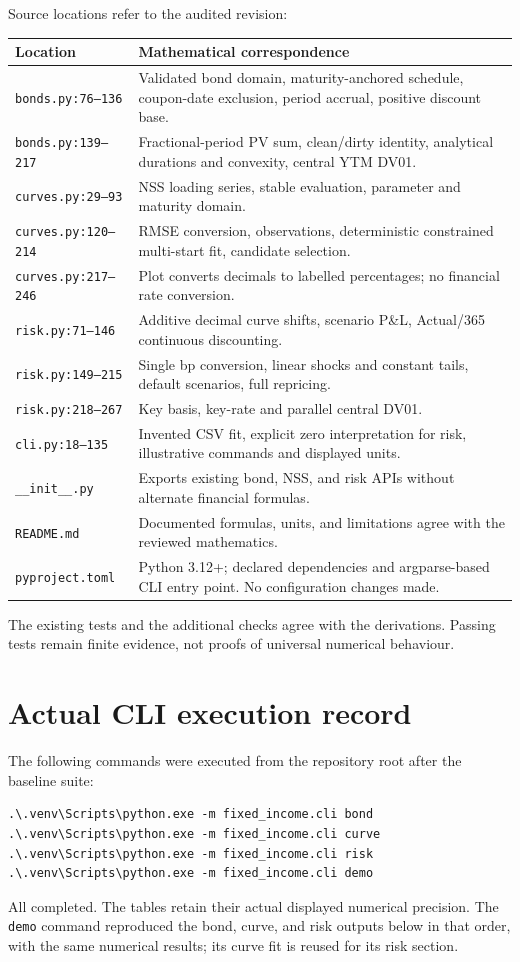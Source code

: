\documentclass[12pt,a4paper]{article}
\begin{document}
Source locations refer to the audited revision:
\small
\begin{longtable}{@{}p{}p{}@{}}
\toprule
Location & Mathematical correspondence\\
\midrule
\endhead
\texttt{bonds.py:76--136} & Validated bond domain, maturity-anchored schedule, coupon-date exclusion, period accrual, positive discount base.\\
\texttt{bonds.py:139--217} & Fractional-period PV sum, clean/dirty identity, analytical durations and convexity, central YTM DV01.\\
\texttt{curves.py:29--93} & NSS loading series, stable evaluation, parameter and maturity domain.\\
\texttt{curves.py:120--214} & RMSE conversion, observations, deterministic constrained multi-start fit, candidate selection.\\
\texttt{curves.py:217--246} & Plot converts decimals to labelled percentages; no financial rate conversion.\\
\texttt{risk.py:71--146} & Additive decimal curve shifts, scenario P\&L, Actual/365 continuous discounting.\\
\texttt{risk.py:149--215} & Single bp conversion, linear shocks and constant tails, default scenarios, full repricing.\\
\texttt{risk.py:218--267} & Key basis, key-rate and parallel central DV01.\\
\texttt{cli.py:18--135} & Invented CSV fit, explicit zero interpretation for risk, illustrative commands and displayed units.\\
\texttt{\_\_init\_\_.py} & Exports existing bond, NSS, and risk APIs without alternate financial formulas.\\
\texttt{README.md} & Documented formulas, units, and limitations agree with the reviewed mathematics.\\
\texttt{pyproject.toml} & Python 3.12+; declared dependencies and argparse-based CLI entry point. No configuration changes made.\\
\bottomrule
\end{longtable}
\normalsize
The existing tests and the additional checks agree with the derivations.
Passing tests remain finite evidence, not proofs of universal numerical
behaviour.

\section{Actual CLI execution record}
The following commands were executed from the repository root after the
baseline suite:
\begin{verbatim}
.\.venv\Scripts\python.exe -m fixed_income.cli bond
.\.venv\Scripts\python.exe -m fixed_income.cli curve
.\.venv\Scripts\python.exe -m fixed_income.cli risk
.\.venv\Scripts\python.exe -m fixed_income.cli demo
\end{verbatim}
All completed. The tables retain their actual displayed numerical
precision. The \texttt{demo} command reproduced the bond, curve, and
risk outputs below in that order, with the same numerical results;
its curve fit is reused for its risk section.
\end{document}
